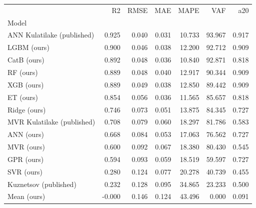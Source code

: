 \begin{tabular}{lrrrrrr}
\toprule
 & R2 & RMSE & MAE & MAPE & VAF & a20 \\
Model &  &  &  &  &  &  \\
\midrule
ANN Kulatilake (published) & 0.925 & 0.040 & 0.031 & 10.733 & 93.967 & 0.917 \\
LGBM (ours) & 0.900 & 0.046 & 0.038 & 12.200 & 92.712 & 0.909 \\
CatB (ours) & 0.892 & 0.048 & 0.036 & 10.840 & 92.871 & 0.818 \\
RF (ours) & 0.889 & 0.048 & 0.040 & 12.917 & 90.344 & 0.909 \\
XGB (ours) & 0.889 & 0.049 & 0.038 & 12.850 & 89.442 & 0.909 \\
ET (ours) & 0.854 & 0.056 & 0.036 & 11.565 & 85.657 & 0.818 \\
Ridge (ours) & 0.746 & 0.073 & 0.051 & 13.875 & 84.345 & 0.727 \\
MVR Kulatilake (published) & 0.708 & 0.079 & 0.060 & 18.297 & 81.786 & 0.583 \\
ANN (ours) & 0.668 & 0.084 & 0.053 & 17.063 & 76.562 & 0.727 \\
MVR (ours) & 0.600 & 0.092 & 0.067 & 18.380 & 80.430 & 0.545 \\
GPR (ours) & 0.594 & 0.093 & 0.059 & 18.519 & 59.597 & 0.727 \\
SVR (ours) & 0.280 & 0.124 & 0.077 & 20.278 & 40.739 & 0.455 \\
Kuznetsov (published) & 0.232 & 0.128 & 0.095 & 34.865 & 23.233 & 0.500 \\
Mean (ours) & -0.000 & 0.146 & 0.124 & 43.496 & 0.000 & 0.091 \\
\bottomrule
\end{tabular}
